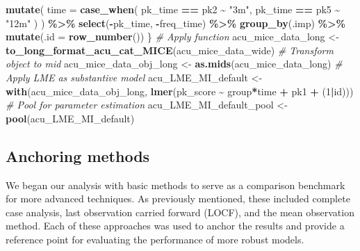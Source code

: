\documentclass{article}
\newenvironment{Shaded}{\begin{snugshade}}{\end{snugshade}}
\newcommand{\AttributeTok}[1]{\textcolor[rgb]{0.13,0.29,0.53}{#1}}
\newcommand{\CommentTok}[1]{\textcolor[rgb]{0.56,0.35,0.01}{\textit{#1}}}
\newcommand{\DecValTok}[1]{\textcolor[rgb]{0.00,0.00,0.81}{#1}}
\newcommand{\FunctionTok}[1]{\textcolor[rgb]{0.13,0.29,0.53}{\textbf{#1}}}
\newcommand{\NormalTok}[1]{#1}
\newcommand{\OtherTok}[1]{\textcolor[rgb]{0.56,0.35,0.01}{#1}}
\newcommand{\SpecialCharTok}[1]{\textcolor[rgb]{0.81,0.36,0.00}{\textbf{#1}}}
\newcommand{\StringTok}[1]{\textcolor[rgb]{0.31,0.60,0.02}{#1}}
\begin{document}
\begin{Shaded}
\begin{Highlighting}[]
    \FunctionTok{mutate}\NormalTok{(}
      \AttributeTok{time =} \FunctionTok{case\_when}\NormalTok{(}
\NormalTok{        pk\_time }\SpecialCharTok{==} \StringTok{\textquotesingle{}pk2\textquotesingle{}} \SpecialCharTok{\textasciitilde{}} \StringTok{"3m"}\NormalTok{,}
\NormalTok{        pk\_time }\SpecialCharTok{==} \StringTok{\textquotesingle{}pk5\textquotesingle{}} \SpecialCharTok{\textasciitilde{}} \StringTok{"12m"}
\NormalTok{      )}
\NormalTok{    ) }\SpecialCharTok{\%\textgreater{}\%}
    \FunctionTok{select}\NormalTok{(}\SpecialCharTok{{-}}\NormalTok{pk\_time, }\SpecialCharTok{{-}}\NormalTok{freq\_time) }\SpecialCharTok{\%\textgreater{}\%}
    \FunctionTok{group\_by}\NormalTok{(.imp) }\SpecialCharTok{\%\textgreater{}\%}
    \FunctionTok{mutate}\NormalTok{(}\AttributeTok{.id =} \FunctionTok{row\_number}\NormalTok{())}
\NormalTok{\}}
\CommentTok{\# Apply function}
\NormalTok{acu\_mice\_data\_long }\OtherTok{\textless{}{-}} \FunctionTok{to\_long\_format\_acu\_cat\_MICE}\NormalTok{(acu\_mice\_data\_wide)}
\CommentTok{\# Transform object to mid}
\NormalTok{acu\_mice\_data\_obj\_long }\OtherTok{\textless{}{-}} \FunctionTok{as.mids}\NormalTok{(acu\_mice\_data\_long)}
\CommentTok{\# Apply LME as substantive model}
\NormalTok{acu\_LME\_MI\_default }\OtherTok{\textless{}{-}} \FunctionTok{with}\NormalTok{(acu\_mice\_data\_obj\_long, }
                           \FunctionTok{lmer}\NormalTok{(pk\_score }\SpecialCharTok{\textasciitilde{}}\NormalTok{ group}\SpecialCharTok{*}\NormalTok{time }\SpecialCharTok{+}\NormalTok{ pk1 }\SpecialCharTok{+}\NormalTok{ (}\DecValTok{1}\SpecialCharTok{|}\NormalTok{id)))}
\CommentTok{\# Pool for parameter estimation}
\NormalTok{acu\_LME\_MI\_default\_pool }\OtherTok{\textless{}{-}} \FunctionTok{pool}\NormalTok{(acu\_LME\_MI\_default)}
\end{Highlighting}
\end{Shaded}

\subsection{Anchoring methods}\label{anchoring-methods}

We began our analysis with basic methods to serve as a comparison
benchmark for more advanced techniques. As previously mentioned, these
included complete case analysis, last observation carried forward
(LOCF), and the mean observation method. Each of these approaches was
used to anchor the results and provide a reference point for evaluating
the performance of more robust models.
\end{document}
